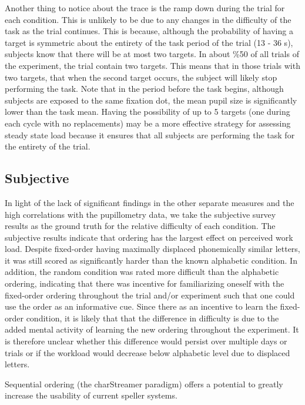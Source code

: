 \documentclass[10pt]{article}
\begin{document}
Another thing to notice about the trace is the ramp down during the
trial for each condition.  This is unlikely to be due to any changes in
the difficulty of the task as the trial continues. This is because, although
the probability of having a target is symmetric about the entirety of
the task period of the trial (13 - 36 s), subjects know that there will be at
most two targets.  In about \%50 of all trials of
the experiment, the trial contain two targets. This means that 
in those trials with two targets, that when the second target occurs, the subject will likely stop
performing the task.  Note that in the period before the task
begins, although subjects are exposed to the same fixation dot, the
mean pupil size is significantly lower than the task mean.  
Having the possibility of up to 5 targets (one during each
cycle with no replacements) may be a more effective strategy
for assessing steady state load because it ensures that all
subjects are performing the task for the entirety of the trial.

\subsection{Subjective}
In light of the lack of significant findings in the other separate
measures and the high correlations with the pupillometry data, we take the subjective survey results as the ground
truth for the relative
difficulty of each condition.  The subjective results indicate that
ordering has the largest effect on perceived work load. Despite
fixed-order having maximally displaced phonemically similar letters,
it was still scored as significantly harder than the known
alphabetic condition.  In addition, the random condition was rated
more difficult than the alphabetic ordering, indicating that there
was incentive for familiarizing oneself with the fixed-order
ordering throughout the trial and/or experiment such that one could
use the order as an informative cue.  Since there as an incentive to
learn the fixed-order condition, it is likely that that the
difference in difficulty is due to the added mental activity of
learning the new ordering throughout the experiment. It is therefore
unclear whether this difference would persist over multiple days or
trials or if the workload would decrease below alphabetic level due
to displaced letters.

Sequential ordering (the charStreamer paradigm) offers a potential to
greatly increase the usability of current speller systems.
\end{document}
